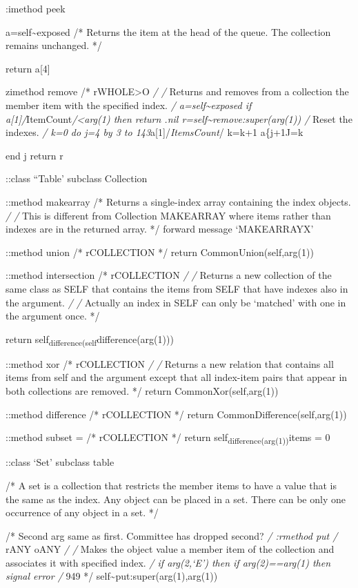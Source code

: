 :imethod peek

a=self\textasciitilde exposed /* Returns the item at the head of the
queue. The collection remains unchanged. */

return a{[}4{]}

zimethod remove /* rWHOLE\textgreater O \emph{/ /} Returns and removes
from a collection the member item with the specified index. \emph{/
a=self\textasciitilde exposed if
a{[}1{]}/}ItemCount\emph{/\textless arg(1) then return .nil
r=self\textasciitilde remove:super(arg(1)) /} Reset the indexes. \emph{/
k=0 do j=4 by 3 to 143}a{[}1{]}/\emph{ItemsCount}/ k=k+1 a\{j+1J=k

end j return r

::class ``Table' subclass Collection

::method makearray /* Returns a single-index array containing the index
objects. \emph{/ /} This is different from Collection MAKEARRAY where
items rather than indexes are in the returned array. */ forward message
`MAKEARRAYX'

::method union /* rCOLLECTION */ return CommonUnion(self,arg(1))

::method intersection /* rCOLLECTION \emph{/ /} Returns a new collection
of the same class as SELF that contains the items from SELF that have
indexes also in the argument. \emph{/ /} Actually an index in SELF can
only be `matched' with one in the argument once. */

return self\textsubscript{difference(self}difference(arg(1)))

::method xor /* rCOLLECTION \emph{/ /} Returns a new relation that
contains all items from self and the argument except that all index-item
pairs that appear in both collections are removed. */ return
CommonXor(self,arg(1))

::method difference /* rCOLLECTION */ return
CommonDifference(self,arg(1))

::method subset = /* rCOLLECTION */ return
self\textsubscript{difference(arg(1))}items = 0

::class `Set' subclass table

/* A set is a collection that restricts the member items to have a value
that is the same as the index. Any object can be placed in a set. There
can be only one occurrence of any object in a set. */

/* Second arg same as first. Committee has dropped second? \emph{/
:rmethod put /} rANY oANY \emph{/ /} Makes the object value a member
item of the collection and associates it with specified index. \emph{/
if arg(2,`E') then if arg(2)==arg(1) then signal error /} 949 */
self\textasciitilde put:super(arg(1),arg(1))

